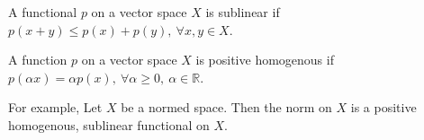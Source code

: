 
\begin{definition}[sublinear]
	A functional $p$ on a vector space $X$ is sublinear if
	$p(x+y) \le p(x) + p(y),\ \forall x,y \in X$.
\end{definition}

\begin{definition}
	A function $p$ on a vector space $X$ is positive homogenous if
	$p(\alpha x) = \alpha p(x),\ \forall \alpha \ge 0,\ \alpha \in \mathbb{R}$.
\end{definition}
For example, Let $X$ be a normed space. Then the norm on $X$ is a positive homogenous, sublinear functional on $X$.

